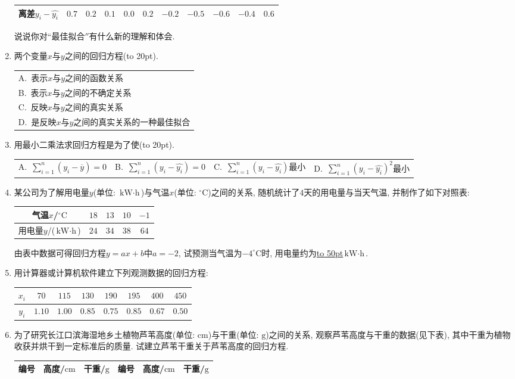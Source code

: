 \documentclass[10pt,a4paper]{article}
\newcommand{\blank}[1]{\underline{\hbox to #1pt{}}}
\newcommand{\bracket}[1]{(\hbox to #1pt{})}
\newcommand{\onech}[4]{\par\begin{tabular}{p{.9\textwidth}}
A.~#1\\
B.~#2\\
C.~#3\\
D.~#4
\end{tabular}}
\newcommand{\fourch}[4]{\par\begin{tabular}{p{.23\textwidth}p{.23\textwidth}p{.23\textwidth}p{.23\textwidth}}
A.~#1 &B.~#2& C.~#3& D.~#4
\end{tabular}}
\begin{document}
\begin{enumerate}[1.]
\begin{center}
\begin{tabular}{|c|c|c|c|c|c|c|c|c|c|c|}
离差$y_i-\hat{y_i}$ & $0.7$ & $0.2$ & $0.1$ & $0.0$ & $0.2$ & $-0.2$ & $-0.5$ & $-0.6$ & $-0.4$ & $0.6$ \\ \hline
\end{tabular}
\end{center}
说说你对``最佳拟合$''$有什么新的理解和体会.
\item 两个变量$x$与$y$之间的回归方程\bracket{20}.
\onech{表示$x$与$y$之间的函数关系}{表示$x$与$y$之间的不确定关系}{反映$x$与$y$之间的真实关系}{是反映$x$与$y$之间的真实关系的一种最佳拟合}
\item 用最小二乘法求回归方程是为了使\bracket{20}.
\fourch{$\displaystyle\sum_{i=1}^n(y_i-\overline{y})=0$}{$\displaystyle\sum_{i=1}^n(y_i-\hat{y_i})=0$}{$\displaystyle\sum_{i=1}^n(y_i-\hat{y_i})$最小}{$\displaystyle\sum_{i=1}^n(y_i-\hat{y_i})^2$最小} 
\item 某公司为了解用电量$y$(单位: $\text{kW}\cdot \text{h}$)与气温$x$(单位: $^\circ\text{C}$)之间的关系, 随机统计了$4$天的用电量与当天气温, 并制作了如下对照表: 
\begin{center}
\begin{tabular}{|c|c|c|c|c|}
\hline
气温$x$/$^\circ\text{C}$ & $18$ & $13$ & $10$ & $-1$ \\ \hline
用电量$y$/($\text{kW}\cdot \text{h}$) & $24$ & $34$ & $38$ & $64$ \\ \hline
\end{tabular}
\end{center}
由表中数据可得回归方程$y=ax+b$中$a=-2$, 试预测当气温为$-4^\circ\text{C}$时, 用电量约为\blank{50}$\text{kW}\cdot \text{h}$.
\item 用计算器或计算机软件建立下列观测数据的回归方程:
\begin{center}
\begin{tabular}{|c|c|c|c|c|c|c|c|}
\hline
$x_i$ & $70$ & $115$ & $130$ & $190$ & $195$ & $400$ & $450$ \\ \hline
$y_i$ & $1.10$ & $1.00$ & $0.85$ & $0.75$ & $0.85$ & $0.67$ & $0.50$ \\ \hline
\end{tabular}
\end{center}
\item 为了研究长江口滨海湿地乡土植物芦苇高度(单位: $\text{cm}$)与干重(单位: $\text{g}$)之间的关系, 观察芦苇高度与干重的数据(见下表), 其中干重为植物收获并烘干到一定标准后的质量. 试建立芦苇干重关于芦苇高度的回归方程.
\begin{center}
\begin{longtable}{|c|c|c|c|c|c|}
\hline
编号 & 高度/$\text{cm}$ & 干重/$\text{g}$ & 编号 & 高度/$\text{cm}$ & 干重/$\text{g}$ \\ \hline

\end{longtable}
\end{center}
\end{enumerate}
\end{document}
